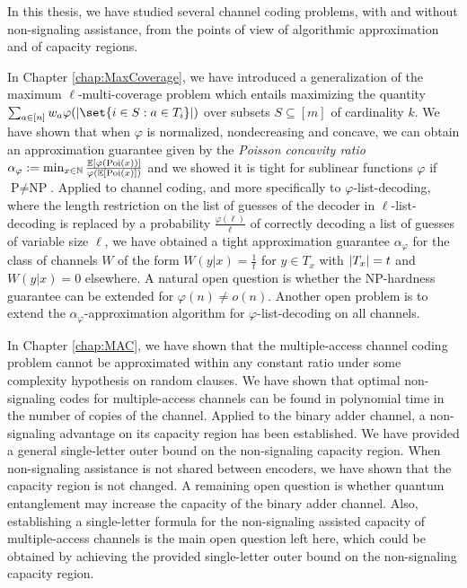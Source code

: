 In this thesis, we have studied several channel coding problems, with and without non-signaling assistance, from the points of view of algorithmic approximation and of capacity regions.

In Chapter \ref{chap:MaxCoverage}, we have introduced a generalization of the maximum $\ell$-multi-coverage problem which entails maximizing the quantity $\sum_{a \in [n]}  w_a\varphi(\abs{\set{i \in S : a \in T_i}})$ over subsets $S \subseteq [m]$ of cardinality $k$. We have shown that when $\varphi$ is normalized, nondecreasing and concave, we can obtain an approximation guarantee given by the \emph{Poisson concavity ratio} $\alpha_{\varphi} := \min_{x \in \mathbb{N}} \frac{\mathbb{E}[\varphi(\operatorname{\text{Poi}}(x))]}{\varphi(\mathbb{E}[\operatorname{\text{Poi}}(x)])}$ and we showed it is tight for sublinear functions $\varphi$ if $\textrm{P}\not=\textrm{NP}$. Applied to channel coding, and more specifically to $\varphi$-list-decoding, where the length restriction on the list of guesses of the decoder in $\ell$-list-decoding is replaced by a probability $\frac{\varphi(\ell)}{\ell}$ of correctly decoding a list of guesses of variable size $\ell$, we have obtained a tight approximation guarantee $\alpha_{\varphi}$ for the class of channels $W$ of the form $W(y|x) = \frac{1}{t}$ for $y \in T_x$ with $\abs{T_x}=t$ and $W(y|x) = 0$ elsewhere. A natural open question is whether the \textrm{NP}-hardness guarantee can be extended for $\varphi(n) \not= o(n)$. Another open problem is to extend the $\alpha_{\varphi}$-approximation algorithm for $\varphi$-list-decoding on all channels.

In Chapter \ref{chap:MAC}, we have shown that the multiple-access channel coding problem cannot be approximated within any constant ratio under some complexity hypothesis on random clauses. We have shown that optimal non-signaling codes for multiple-access channels can be found in polynomial time in the number of copies of the channel. Applied to the binary adder channel, a non-signaling advantage on its capacity region has been established. We have provided a general single-letter outer bound on the non-signaling capacity region. When non-signaling assistance is not shared between encoders, we have shown that the capacity region is not changed. A remaining open question is whether quantum entanglement may increase the capacity of the binary adder channel. Also, establishing a single-letter formula for the non-signaling assisted capacity of multiple-access channels is the main open question left here, which could be obtained by achieving the provided single-letter outer bound on the non-signaling capacity region.

